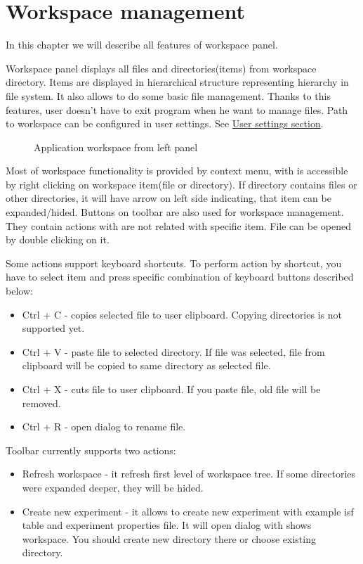 \section{Workspace management}\label{section:workspace}

In this chapter we will describe all features of workspace panel.

Workspace panel displays all files and directories(items) from workspace directory. Items are displayed in hierarchical structure representing hierarchy in file system. It also allows to do some basic file management. Thanks to this features, user doesn't have to exit program when he want to manage files. Path to workspace can be configured in user settings. See \hyperref[section:user-settings]{User settings section}.

\begin{figure*}[!ht] 
	\centering
	\caption{Application workspace from left panel}
\end{figure*}

Most of workspace functionality is provided by context menu, with is accessible by right clicking on workspace item(file or directory). If directory contains files or other directories, it will have arrow on left side indicating, that item can be expanded/hided. Buttons on toolbar are also used for workspace management. They contain actions with are not related with specific item. File can be opened by double clicking on it.

Some actions support keyboard shortcuts. To perform action by shortcut, you have to select item and press specific combination of keyboard buttons described below:
\begin{itemize}
	\item Ctrl + C - copies selected file to user clipboard. Copying directories is not supported yet.
	\item Ctrl + V - paste file to selected directory. If file was selected, file from clipboard will be copied to same directory as selected file.
	\item Ctrl + X - cuts file to user clipboard. If you paste file, old file will be removed.
	\item Ctrl + R - open dialog to rename file.
\end{itemize}


Toolbar currently supports two actions:

\begin{itemize}
	\item Refresh workspace - it refresh first level of workspace tree. If some directories were expanded deeper, they will be hided.
	\item Create new experiment - it allows to create new experiment with example isf table and experiment properties file. It will open dialog with shows workspace. You should create new directory there or choose existing directory.
\end{itemize}


